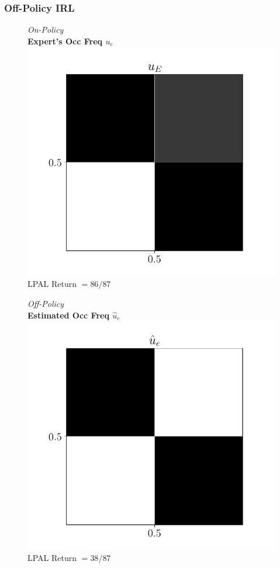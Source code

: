 \documentclass{beamer}
\begin{document}
\begin{frame}
\frametitle{Off-Policy IRL}
\begin{figure}
  \begin{center}
  \begin{minipage}{0.45\linewidth}
    \centering
    \emph{On-Policy}\\
    \textbf{Expert's Occ Freq $u_e$}
    \includegraphics[width=\linewidth]{../../pres_roil/plots/all_state/ue.pdf}
    LPAL Return $= 86/87$
  \end{minipage}
  \begin{minipage}{0.45\linewidth}
    \centering
    \emph{Off-Policy}\\
    \textbf{Estimated Occ Freq $\hat{u}_e$}
    \includegraphics[width=\linewidth]{../../pres_roil/plots/all_state/uehat.pdf}
    LPAL Return $= 38/87$
  \end{minipage}
  \end{center}
\end{figure}
\end{frame}
\end{document}
